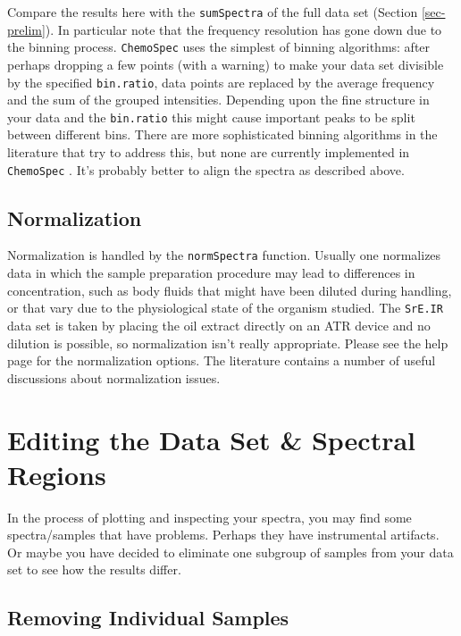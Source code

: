 \documentclass[letter,10pt,twocolumn,twoside,printwatermark=false]{pinp}
\begin{document}
Compare the results here with the \texttt{sumSpectra} of the full data
set (Section \ref{sec-prelim}). In particular note that the frequency
resolution has gone down due to the binning process. \texttt{ChemoSpec}
uses the simplest of binning algorithms: after perhaps dropping a few
points (with a warning) to make your data set divisible by the specified
\texttt{bin.ratio}, data points are replaced by the average frequency
and the sum of the grouped intensities. Depending upon the fine
structure in your data and the \texttt{bin.ratio} this might cause
important peaks to be split between different bins. There are more
sophisticated binning algorithms in the literature that try to address
this, but none are currently implemented in \texttt{ChemoSpec}
\citep{Anderson2008, DeMeyer2008, Sousa2013}. It's probably better to
align the spectra as described above.

\hypertarget{normalization}{%
\subsection{Normalization}\label{normalization}}

Normalization is handled by the \texttt{normSpectra} function. Usually
one normalizes data in which the sample preparation procedure may lead
to differences in concentration, such as body fluids that might have
been diluted during handling, or that vary due to the physiological
state of the organism studied. The \texttt{SrE.IR} data set is taken by
placing the oil extract directly on an ATR device and no dilution is
possible, so normalization isn't really appropriate. Please see the help
page for the normalization options. The literature contains a number of
useful discussions about normalization
issues.\citep{Craig2006, Romano2000, vandenBerg2006, Filzmoser2009, Zhang2009}

\hypertarget{editing-the-data-set-spectral-regions}{%
\section{Editing the Data Set \& Spectral
Regions}\label{editing-the-data-set-spectral-regions}}

In the process of plotting and inspecting your spectra, you may find
some spectra/samples that have problems. Perhaps they have instrumental
artifacts. Or maybe you have decided to eliminate one subgroup of
samples from your data set to see how the results differ.

\hypertarget{removing-individual-samples}{%
\subsection{Removing Individual
Samples}\label{removing-individual-samples}}
\end{document}
